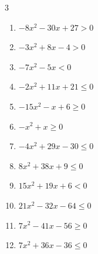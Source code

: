 \begin{multicols}{3}
\begin{enumerate}
\columnbreak %

  \item $-8x^{2}-30x+27>0$


  \item $-3x^{2}+8x-4>0$


  \item $-7x^{2}-5x<0$


  \item $-2x^{2}+11x+21\leq 0$


  \item $-15x^{2}-x+6\geq 0$


  \item $-x^{2}+x\geq 0$

        \phantom{$\displaystyle 0 \leqq x \leqq 1$}

  \item $-4x^{2}+29x-30\leq 0$


  \item $8x^{2}+38x+9\leq 0$


  \item $15x^{2}+19x+6<0$


  \item $21x^{2}-32x-64\leq 0$


\columnbreak %

  \item $7x^{2}-41x-56\geq 0$


  \item $7x^{2}+36x-36\leq 0$


\end{enumerate}
\end{multicols}
